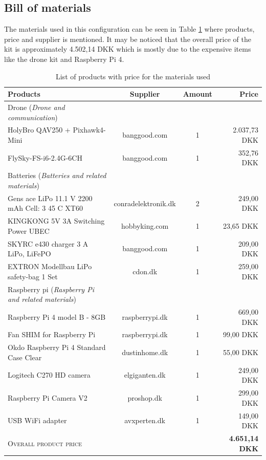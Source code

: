 \documentclass[../Head/report.tex]{subfiles}
\begin{document}
\subsection{Bill of materials}
\label{sec:bill_of_materials}

The materials used in this configuration can be seen in Table \ref{tab:bill_of_materials} where products, price and supplier is mentioned. It may be noticed that the overall price of the kit is approximately 4.502,14 DKK which is mostly due to the expensive items like the drone kit and Raspberry Pi 4.   

\newcommand{\done}{\cellcolor{teal}done}  %
\newcommand{\hcyan}[1]{{\color{teal} #1}}

\begin{table}[H]
\centering
\caption{List of products with price for the materials used}
\label{tab:bill_of_materials}
\begin{tabular}{lccr}
\toprule
Products & Supplier & Amount & Price\\
\midrule

Drone (\textit{Drone and communication}) \\
\phantom{ZZ} HolyBro QAV250 + Pixhawk4-Mini & banggood.com & 1 & 2.037,73 DKK\\
\phantom{ZZ} FlySky-FS-i6-2.4G-6CH & banggood.com & 1 & 352,76 DKK \\

Batteries (\textit{Batteries and related materials}) & \\
\phantom{ZZ} Gens ace LiPo 11.1 V 2200 mAh Cell: 3 45 C XT60 & conradelektronik.dk & 2 & 249,00 DKK \\
\phantom{ZZ} KINGKONG 5V 3A Switching Power UBEC & hobbyking.com & 1 & 23,65 DKK \\
\phantom{ZZ} SKYRC e430 charger 3 A LiPo, LiFePO & banggood.com & 1 & 209,00 DKK \\
\phantom{ZZ} EXTRON Modellbau LiPo safety-bag 1 Set & cdon.dk & 1 & 259,00 DKK \\

Raspberry pi (\textit{Raspberry Pi and related materials}) & \\
\phantom{ZZ} Raspberry Pi 4 model B - 8GB & raspberrypi.dk & 1 & 669,00 DKK \\
\phantom{ZZ} Fan SHIM for Raspberry Pi & raspberrypi.dk & 1 & 99,00 DKK \\
\phantom{ZZ} Okdo Raspberry Pi 4 Standard Case Clear & dustinhome.dk & 1 & 55,00 DKK \\
\phantom{ZZ} Logitech C270 HD camera & elgiganten.dk & 1 & 249,00 DKK \\
\phantom{ZZ} Raspberry Pi Camera V2 & proshop.dk & 1 & 299,00 DKK \\
\phantom{ZZ} USB WiFi adapter & avxperten.dk & 1 & 149,00 DKK \\

\textsc{Overall product price} & & & \textbf{4.651,14 DKK} \\

\bottomrule                
\end{tabular}
\end{table}
\end{document}
